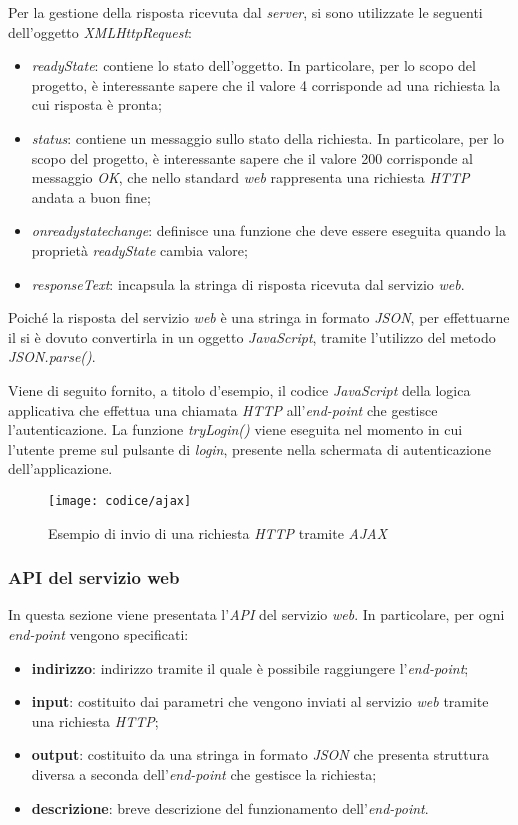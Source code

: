 Per la gestione della risposta ricevuta dal \textit{server}, si sono utilizzate le seguenti  dell'oggetto \textit{XMLHttpRequest}:
\begin{itemize}
	\item \textit{readyState}: contiene lo stato dell'oggetto. In particolare, per lo scopo del progetto, è interessante sapere che il valore 4 corrisponde ad una richiesta la cui risposta è pronta;
	\item  \textit{status}: contiene un messaggio sullo stato della richiesta. In particolare, per lo scopo del progetto, è interessante sapere che il valore 200 corrisponde al messaggio \textit{OK}, che nello standard \textit{web} rappresenta una richiesta \textit{HTTP} andata a buon fine;
	\item \textit{onreadystatechange}: definisce una funzione che deve essere eseguita quando la proprietà \textit{readyState} cambia valore;
	\item \textit{responseText}: incapsula la stringa di risposta ricevuta dal servizio \textit{web}. 
\end{itemize} 
Poiché la risposta del servizio \textit{web} è una stringa in formato \textit{JSON}, per effettuarne il  si è dovuto convertirla in un oggetto \textit{JavaScript}, tramite l'utilizzo del metodo \textit{JSON.parse()}.

Viene di seguito fornito, a titolo d'esempio, il codice \textit{JavaScript} della logica applicativa che effettua una chiamata \textit{HTTP} all'\textit{end-point} che gestisce l'autenticazione. La funzione \textit{tryLogin()} viene eseguita nel momento in cui l'utente preme sul pulsante di \textit{login}, presente nella schermata di autenticazione dell'applicazione.

\newpage

\begin{figure}[!h] 
    \centering 
    \texttt{[image: codice/ajax]} 
    \caption{Esempio di invio di una richiesta \textit{HTTP} tramite \textit{AJAX}}
\end{figure}

\subsubsection{API del servizio web} \label{api}

In questa sezione viene presentata l'\textit{API} del servizio \textit{web}. In particolare, per ogni \textit{end-point} vengono specificati:
\begin{itemize}
	\item \textbf{indirizzo}: indirizzo tramite il quale è possibile raggiungere l'\textit{end-point};
	\item \textbf{input}: costituito dai parametri che vengono inviati al servizio \textit{web} tramite una richiesta \textit{HTTP};
	\item \textbf{output}: costituito da una stringa in formato \textit{JSON} che presenta struttura diversa a seconda dell'\textit{end-point} che gestisce la richiesta;
	\item \textbf{descrizione}: breve descrizione del funzionamento dell'\textit{end-point}.
\end{itemize}

